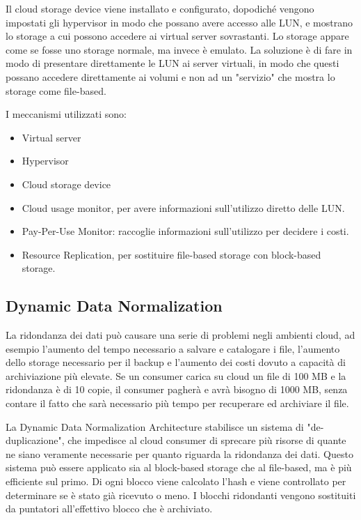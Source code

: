 Il cloud storage device viene installato e configurato, dopodiché vengono impostati gli hypervisor in modo che possano avere accesso alle LUN, e mostrano lo storage a cui possono accedere ai virtual server sovrastanti. Lo storage appare come se fosse uno storage normale, ma invece è emulato. La soluzione è di fare in modo di presentare direttamente le LUN ai server virtuali, in modo che questi possano accedere direttamente ai volumi e non ad un "servizio" che mostra lo storage come file-based.

I meccanismi utilizzati sono:
\begin{itemize}
    \item Virtual server
    \item Hypervisor
    \item Cloud storage device
    \item Cloud usage monitor, per avere informazioni sull'utilizzo diretto delle LUN.
    \item Pay-Per-Use Monitor: raccoglie informazioni sull'utilizzo per decidere i costi.
    \item Resource Replication, per sostituire file-based storage con block-based storage.
\end{itemize}

\subsection{Dynamic Data Normalization}
La ridondanza dei dati può causare una serie di problemi negli ambienti cloud, ad esempio l'aumento del tempo necessario a salvare e catalogare i file, l'aumento dello storage necessario per il backup e l'aumento dei costi dovuto a capacità di archiviazione più elevate. Se un consumer carica su cloud un file di 100 MB e la ridondanza è di 10 copie, il consumer pagherà e avrà bisogno di 1000 MB, senza contare il fatto che sarà necessario più tempo per recuperare ed archiviare il file. 

La Dynamic Data Normalization Architecture stabilisce un sistema di "de-duplicazione", che impedisce al cloud consumer di sprecare più risorse di quante ne siano veramente necessarie per quanto riguarda la ridondanza dei dati. Questo sistema può essere applicato sia al block-based storage che al file-based, ma è più efficiente sul primo. Di ogni blocco viene calcolato l'hash e viene controllato per determinare se è stato già ricevuto o meno. I blocchi ridondanti vengono sostituiti da puntatori all'effettivo blocco che è archiviato.

